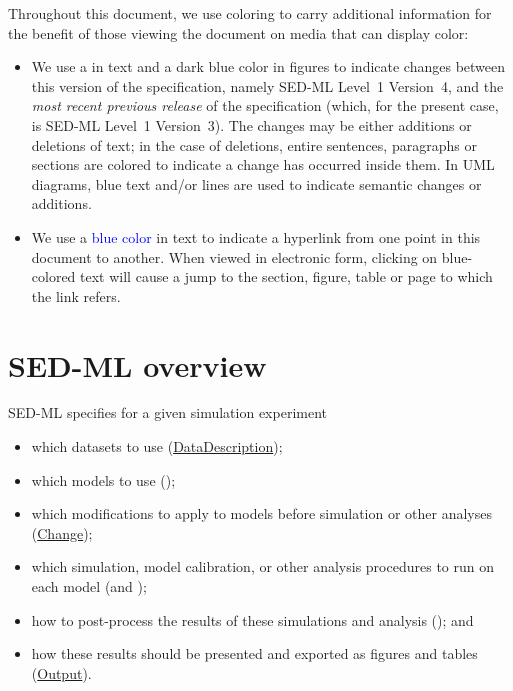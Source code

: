Throughout this document, we use coloring to carry additional
information for the benefit of those viewing the document on media
that can display color:

\begin{itemize}

\item We use a  in text and a \textcolor[rgb]{0.0117, 0.0664, 0.5742}{dark blue color} in figures to indicate changes
  between this version of the specification, namely SED-ML Level~1 Version~4, and
  the \emph{most recent previous release} of the specification
  (which, for the present case, is SED-ML Level~1 Version~3).  The changes may be either
  additions or deletions of text; in the case of deletions, entire
  sentences, paragraphs or sections are colored to indicate a
  change has occurred inside them.  In UML diagrams, blue text and/or lines are used to indicate semantic changes or additions.

\item We use a \textcolor{blue}{blue color} in text to indicate a hyperlink from one
  point in this document to another.  When viewed in electronic form, clicking
  on blue-colored text will cause a jump to the
  section, figure, table or page to which the link refers.

\end{itemize}




\section{SED-ML overview}
SED-ML specifies for a given simulation experiment

\begin{itemize}
\item which datasets to use (\hyperref[class:dataDescription]{DataDescription});
\item which models to use (\Model);
\item which modifications to apply to models before simulation or other analyses (\hyperref[class:change]{Change});
\item which simulation, model calibration, or other analysis procedures to run on each model (\Simulation and \AbstractTask);
\item how to post-process the results of these simulations and analysis (\DataGenerator); and
\item how these results should be presented and exported as figures and tables (\hyperref[class:output]{Output}).
\end{itemize}

